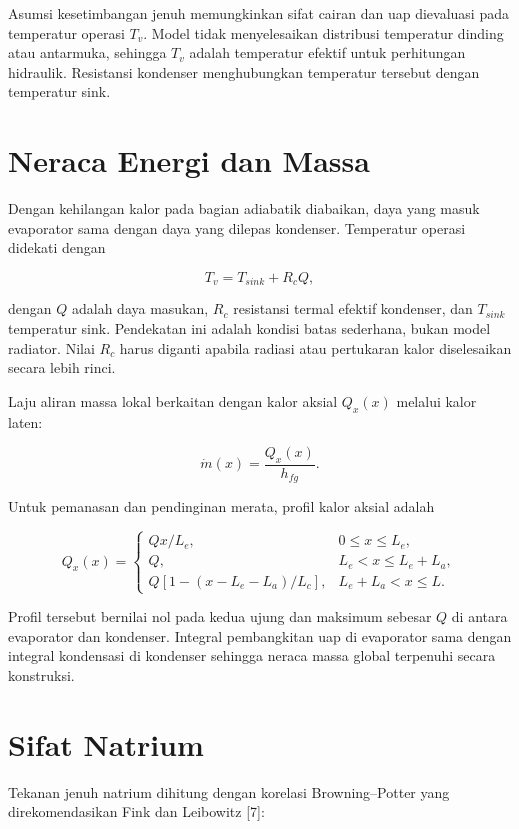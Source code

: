 \documentclass[
  12pt,a4paper,oneside]{report}
\begin{document}
Asumsi kesetimbangan jenuh memungkinkan sifat cairan dan uap dievaluasi
pada temperatur operasi \(T_v\). Model tidak menyelesaikan distribusi
temperatur dinding atau antarmuka, sehingga \(T_v\) adalah temperatur
efektif untuk perhitungan hidraulik. Resistansi kondenser menghubungkan
temperatur tersebut dengan temperatur sink.

\hypertarget{neraca-energi-dan-massa}{%
\section{Neraca Energi dan Massa}\label{neraca-energi-dan-massa}}

Dengan kehilangan kalor pada bagian adiabatik diabaikan, daya yang masuk
evaporator sama dengan daya yang dilepas kondenser. Temperatur operasi
didekati dengan

\[
T_v=T_{sink}+R_cQ,
\tag{3.1}\]

dengan \(Q\) adalah daya masukan, \(R_c\) resistansi termal efektif
kondenser, dan \(T_{sink}\) temperatur sink. Pendekatan ini adalah
kondisi batas sederhana, bukan model radiator. Nilai \(R_c\) harus
diganti apabila radiasi atau pertukaran kalor diselesaikan secara lebih
rinci.

Laju aliran massa lokal berkaitan dengan kalor aksial \(Q_x(x)\) melalui
kalor laten:

\[
\dot m(x)=\frac{Q_x(x)}{h_{fg}}.
\tag{3.2}\]

Untuk pemanasan dan pendinginan merata, profil kalor aksial adalah

\[
Q_x(x)=
\begin{cases}
Q x/L_e, & 0\leq x\leq L_e,\\
Q, & L_e<x\leq L_e+L_a,\\
Q\left[1-(x-L_e-L_a)/L_c\right], & L_e+L_a<x\leq L.
\end{cases}
\tag{3.3}\]

Profil tersebut bernilai nol pada kedua ujung dan maksimum sebesar \(Q\)
di antara evaporator dan kondenser. Integral pembangkitan uap di
evaporator sama dengan integral kondensasi di kondenser sehingga neraca
massa global terpenuhi secara konstruksi.

\hypertarget{sifat-natrium}{%
\section{Sifat Natrium}\label{sifat-natrium}}

Tekanan jenuh natrium dihitung dengan korelasi Browning--Potter yang
direkomendasikan Fink dan Leibowitz {[}7{]}:
\end{document}
